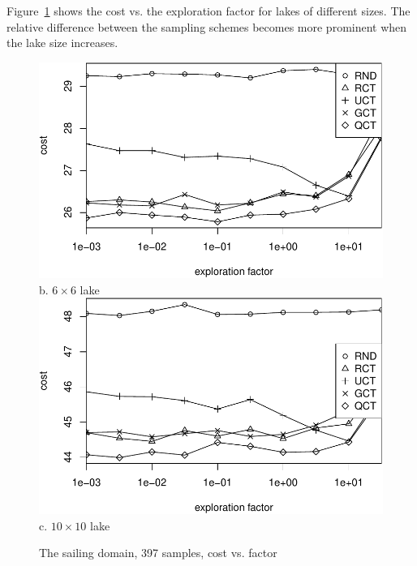\documentclass[letterpaper]{article}
\begin{document}
Figure~\ref{fig:sailing-lake-size} shows the cost vs. the exploration
factor for lakes of different sizes. The relative difference between
the sampling schemes becomes more prominent when the lake size
increases.
\begin{figure}[h!]
   \centering
   \includegraphics[scale=0.45]{costs-size=6-nsamples=397.pdf}\\
   b. $6\times 6$ lake \\
   \vspace{1em}
   \includegraphics[scale=0.45]{costs-size=10-nsamples=397.pdf}\\
   c. $10\times 10$ lake
  \caption{The sailing domain, 397 samples, cost vs. factor}
  \label{fig:sailing-lake-size}
\end{figure}
\end{document}
